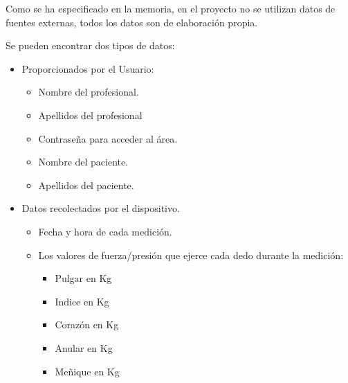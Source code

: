 
Como se ha especificado en la memoria, en el proyecto no se utilizan datos de fuentes externas, todos los datos son de elaboración propia.

Se pueden encontrar dos tipos de datos:
\begin{itemize}
    \item Proporcionados por el Usuario:
    \begin{itemize}
        \item Nombre del profesional. 
        \item Apellidos del profesional
        \item Contraseña para acceder al área.
        \item Nombre del paciente.
        \item Apellidos del paciente.
    \end{itemize}
        \item Datos recolectados por el dispositivo.
        \begin{itemize}
            \item Fecha y hora de cada medición.
            \item Los valores de fuerza/presión que ejerce cada dedo durante la medición:
            \begin{itemize}
                \item Pulgar en Kg
                \item Indice en Kg
                \item Corazón en Kg
                \item Anular en Kg
                \item Meñique en Kg
            \end{itemize}
        \end{itemize}
\end{itemize}
